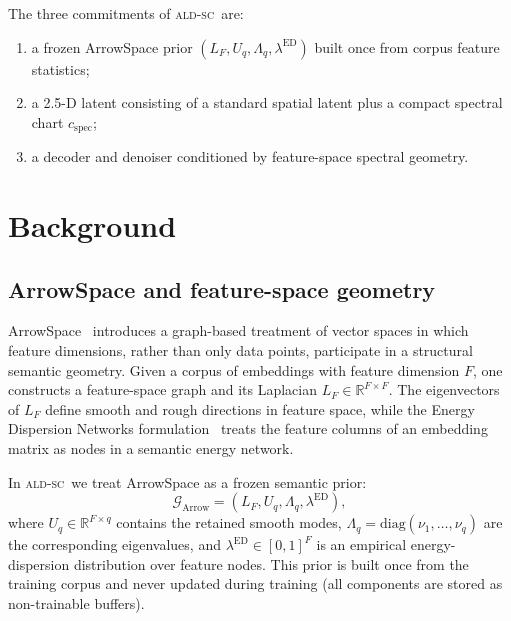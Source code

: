 \documentclass[11pt]{article}
\newcommand{\ALDSC}{\textsc{ald-sc}}
\newcommand{\Lf}{L_F}
\newcommand{\Uq}{U_q}
\newcommand{\Lq}{\Lambda_q}
\newcommand{\ed}{\lambda^{\mathrm{ED}}}
\newcommand{\R}{\mathbb{R}}
\begin{document}
    The three commitments of \ALDSC~are:
    \begin{enumerate}[leftmargin=1.5em]
      \item a frozen ArrowSpace prior $(\Lf,\Uq,\Lq,\ed)$ built once from corpus feature statistics;
      \item a 2.5-D latent consisting of a standard spatial latent plus a compact spectral chart $c_{\mathrm{spec}}$;
      \item a decoder and denoiser conditioned by feature-space spectral geometry.
    \end{enumerate}

    \section{Background}
    \label{sec:background}

    \subsection{ArrowSpace and feature-space geometry}
    \label{sec:arrowspace}
    ArrowSpace~\cite{Moriondo2025JOSS} introduces a graph-based
    treatment of vector spaces in which feature dimensions, rather
    than only data points, participate in a structural semantic
    geometry. Given a corpus of embeddings with feature dimension $F$,
    one constructs a feature-space graph and its Laplacian $\Lf \in
    \R^{F \times F}$. The eigenvectors of $\Lf$ define smooth and
    rough directions in feature space, while the Energy Dispersion
    Networks formulation~\cite{MoriondoAzizi2026} treats the feature
    columns of an embedding matrix as nodes in a semantic energy
    network.

    In \ALDSC~we treat ArrowSpace as a frozen semantic prior:
    \[ \mathcal{G}_{\mathrm{Arrow}} = (\Lf,\Uq,\Lq,\ed),\]
    where $\Uq \in \R^{F \times q}$ contains the retained smooth
    modes, $\Lq = \mathrm{diag}(\nu_1,\ldots,\nu_q)$ are the
    corresponding eigenvalues, and $\ed \in [0,1]^F$ is an empirical
    energy-dispersion distribution over feature nodes. This prior is
    built once from the training corpus and never updated during
    training (all components are stored as non-trainable buffers).
\end{document}
